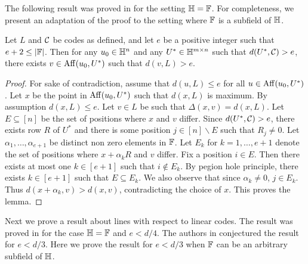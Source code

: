 The following result was proved in \cite{ligero} for the setting $\mathbb{H}=\mathbb{F}$.
For completeness, we present an adaptation of the proof to the setting where
$\mathbb{F}$ is a subfield of $\mathbb{H}$.
\begin{lemma}\label{lem:farpoint}
Let $L$ and $\mathcal{C}$ be codes as defined, and let $e$ be a positive integer such that $e+2\leq |\mathbb{F}|$. Then for any $u_0\in \mathbb{H}^n$ and any $U^\ast\in \mathbb{H}^{m\times n}$ such that $d(U^\ast,\mathcal{C})>e$, there exists $v\in {\rm Aff}({u_0},{U^\ast})$ such that $d(v,L)>e$.
\end{lemma} 
\begin{proof}
For sake of contradiction, assume that $d(u,L)\leq e$ for all $u\in
{\rm Aff}({u_0},{U^\ast})$. Let $x$ be the point in ${\rm Aff}({u_0},{U^\ast})$ such that
$d(x,L)$ is maximum. By assumption $d(x,L)\leq e$. Let $v\in L$ be such that
$\Delta(x,v)=d(x,L)$. Let $E\subseteq [n]$ be the set of positions where $x$ and
$v$ differ. Since $d(U^\ast,\mathcal{C})>e$, there exists row $R$ of $U^\ast$ and there is some 
position $j\in [n]\backslash E$ 
such that $R_j\neq 0$. Let
$\alpha_1,\ldots,\alpha_{e+1}$ be distinct non zero elements in $\mathbb{F}$. Let $E_k$
for $k=1,\ldots,e+1$ denote the set of positions where $x+\alpha_kR$ and $v$
differ. Fix a position $i\in E$. Then there exists at most one $k\in [e+1]$ such
that $i\not\in E_k$. By pegion hole principle, there exists $k\in [e+1]$ such
that $E\subseteq E_k$. We also observe that since $\alpha_k\neq 0$, $j\in E_k$.
Thus $d(x+\alpha_k,v)>d(x,v)$, contradicting the choice of $x$. This proves the
lemma.   
\end{proof}

Next we prove a result about lines with respect to linear codes. The result was
proved in \cite{ligero} for the case $\mathbb{H}=\mathbb{F}$ and $e<d/4$. The authors in
\cite{ligero} conjectured the result for $e<d/3$. Here we prove the result for
$e<d/3$ when $\mathbb{F}$ can be an arbitrary subfield of $\mathbb{H}$.

